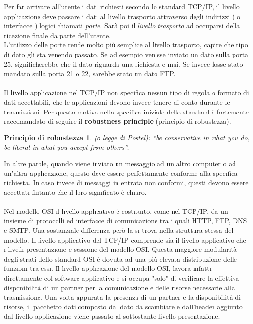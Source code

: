 \documentclass[a4paper, 11pt, oneside]{book}
\theoremstyle{plain}
\begin{document}
Per far arrivare all'utente i dati richiesti secondo lo standard TCP/IP, il livello applicazione deve passare i dati al livello trasporto attraverso degli indirizzi ( o interfacce ) logici chiamati \textit{porte}. Sarà poi il\textit{ livello trasporto} ad occuparsi della ricezione finale da parte dell'utente.\\
L'utilizzo delle porte rende molto più semplice al livello trasporto, capire che tipo di dato gli sta venendo passato. Se ad esempio venisse inviato un dato sulla porta 25, significherebbe che il dato riguarda una richiesta e-mai. Se invece fosse stato mandato sulla porta 21 o 22, sarebbe stato un dato FTP.\\\\ 
Il livello applicazione nel TCP/IP non specifica nessun tipo di regola o formato di dati accettabili, che le applicazioni devono invece tenere di conto durante le trasmissioni. Per questo motivo nella specifica iniziale dello standard è fortemente raccomandato di seguire il \textbf{robustness principle} (principio di robustezza). \\

\newtheorem*{theorem*}{Principio di robustezza}
\begin{theorem*}
(o legge di Postel): “be conservative in what you do, be liberal in what you accept from others”.
 \end{theorem*} 
 In altre parole, quando viene inviato un messaggio 			ad un altro computer o ad un'altra applicazione, questo deve essere perfettamente conforme alla specifica richiesta. In caso invece di messaggi in entrata non conformi, questi devono essere accettati fintanto che il loro significato è chiaro.\\\\
Nel modello OSI il livello applicativo è costituito, come nel TCP/IP, da un insieme di protocolli ed interfacce di comunicazione tra i quali HTTP, FTP, DNS e SMTP. Una sostanziale differenza però la si trova nella struttura stessa del modello. Il livello applicativo del TCP/IP comprende sia il livello applicativo che i livelli presentazione e sessione del modello OSI. Questa maggiore modularità degli strati dello standard OSI è dovuta ad una più elevata distribuzione delle funzioni tra essi. Il livello applicazione del modello OSI, lavora infatti direttamente col software applicativo e si occupa "solo" di verificare la effettiva disponibilità di un partner per la comunicazione e delle risorse necessarie alla trasmissione. Una volta appurata la presenza di un partner e la disponibilità di risorse, il pacchetto dati composto dal dato da scambiare e dall'header aggiunto dal livello applicazione viene passato al sottostante livello presentazione.
\end{document}
